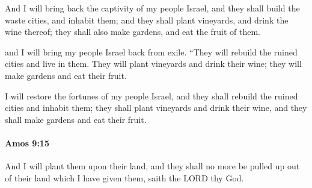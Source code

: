 			\begin{versebox}
					\item[BHS] 
					\item[LXX] 
					\item[ASV] And I will bring back the captivity of my people Israel, and they shall build the waste cities, and inhabit them; and they shall plant vineyards, and drink the wine thereof; they shall also make gardens, and eat the fruit of them.
					\item[NIV] and I will bring my people Israel back from exile. “They will rebuild the ruined cities and live in them. They will plant vineyards and drink their wine; they will make gardens and eat their fruit.
					\item[NRSV] I will restore the fortunes of my people Israel, and they shall rebuild the ruined cities and inhabit them; they shall plant vineyards and drink their wine, and they shall make gardens and eat their fruit.
			\end{versebox}

		\paragraph{Amos 9:15} %
			\label{AMOS-9-15}

			And I will plant them upon their land, and they shall no more be pulled up out of their land which I have given them, saith the LORD thy God.

